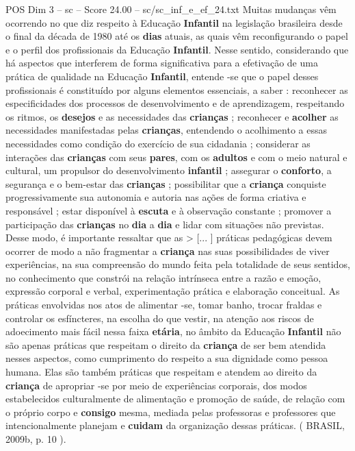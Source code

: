 \begin{textsample}{POS Dim 3 – sc – Score 24.00 – sc/sc\_inf\_e\_ef\_24.txt}
Muitas mudanças vêm ocorrendo no que diz respeito à Educação \textbf{Infantil} na legislação brasileira desde o final da década de 1980 até os \textbf{dias} atuais, as quais vêm reconfigurando o papel e o perfil dos profissionais da Educação \textbf{Infantil}.
Nesse sentido, considerando que há aspectos que interferem de forma significativa para a efetivação de uma prática de qualidade na Educação \textbf{Infantil}, entende -se que o papel desses profissionais é constituído por alguns elementos essenciais, a saber : reconhecer as especificidades dos processos de desenvolvimento e de aprendizagem, respeitando os ritmos, os \textbf{desejos} e as necessidades das \textbf{crianças} ; reconhecer e \textbf{acolher} as necessidades manifestadas pelas \textbf{crianças}, entendendo o acolhimento a essas necessidades como condição do exercício de sua cidadania ; considerar as interações das \textbf{crianças} com seus \textbf{pares}, com os \textbf{adultos} e com o meio natural e cultural, um propulsor do desenvolvimento \textbf{infantil} ; assegurar o \textbf{conforto}, a segurança e o bem-estar das \textbf{crianças} ; possibilitar que a \textbf{criança} conquiste progressivamente sua autonomia e autoria nas ações de forma criativa e responsável ; estar disponível à \textbf{escuta} e à observação constante ; promover a participação das \textbf{crianças} no \textbf{dia} a \textbf{dia} e lidar com situações não previstas.
Desse modo, é importante ressaltar que as > [... ] práticas pedagógicas devem ocorrer de modo a não fragmentar a \textbf{criança} nas suas possibilidades de viver experiências, na sua compreensão do mundo feita pela totalidade de seus sentidos, no conhecimento que constrói na relação intrínseca entre a razão e emoção, expressão corporal e verbal, experimentação prática e elaboração conceitual.
As práticas envolvidas nos atos de alimentar -se, tomar banho, trocar fraldas e controlar os esfíncteres, na escolha do que vestir, na atenção aos riscos de adoecimento mais fácil nessa faixa \textbf{etária}, no âmbito da Educação \textbf{Infantil} não são apenas práticas que respeitam o direito da \textbf{criança} de ser bem atendida nesses aspectos, como cumprimento do respeito a sua dignidade como pessoa humana.
Elas são também práticas que respeitam e atendem ao direito da \textbf{criança} de apropriar -se por meio de experiências corporais, dos modos estabelecidos culturalmente de alimentação e promoção de saúde, de relação com o próprio corpo e \textbf{consigo} mesma, mediada pelas professoras e professores que intencionalmente planejam e \textbf{cuidam} da organização dessas práticas. ( BRASIL, 2009b, p. 10 ).

\end{textsample}

